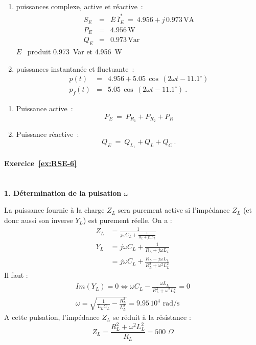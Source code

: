 \begin{enumerate}
	\item puissances complexe, active et réactive~:
	\begin{eqnarray*}
		S_E &=& \bar{E} \, \bar{I}_E^{\ast} \: = \ 4.956 + j\, 0.973 \, \text{VA}\\
		P_E &=& 4.956 \, \text{W}\\
		Q_E &=& 0.973 \, \text{Var}
	\end{eqnarray*}
	$E$ \, produit 0.973$\,$ Var et 4.956$\,$ W
	\item puissances instantanée et fluctuante~:
	\begin{eqnarray*}
		p(t) &=& 4.956 + 5.05\, \cos \, (2\omega t - 11.1^{\circ})\\
		p_f(t) &=& 5.05 \, \cos \, (2\omega t - 11.1^{\circ})~.
	\end{eqnarray*}
\end{enumerate}
\begin{enumerate}
	\item Puissance active~:
	\[ P_E \: = \: P_{R_1} + P_{R_2} + P_R \]
	\item Puissance réactive~:
	\[ Q_E \: = \: Q_{L_1} + Q_L + Q_C~. \]
\end{enumerate}

\paragraph{Exercice~\ref{ex:RSE-6}}~\\%
{\bf 1. Détermination de la pulsation $\omega$}

La puissance fournie à la charge $Z_L$ sera purement active si
l'impédance $Z_L$ (et donc aussi son inverse $Y_L$) est purement
réelle.
On a : 
\begin{align*}
	Z_L&=\frac{1}{j\omega C_L +\frac{1}{R_L+j\omega L_L}} \\
	Y_L & = j\omega C_L +\frac{1}{R_L+j\omega L_L}\\
	& = j\omega C_L  + \frac{R_L-j\omega L_L}{R_L^2+\omega^2 L_L^2}
\end{align*}
Il faut :
\begin{gather*}
	Im(Y_L)= 0 \Leftrightarrow 
	\omega C_L -\frac{\omega L_L}{R_L^2+\omega^2 L_L^2}=0\\
	\omega=\sqrt{\frac{1}{L_LC_L}-\frac{R_L^2}{L_L^2}} = 9.95\, 10^4 \text{~rad/s}
\end{gather*}
A cette pulsation, l'impédance $Z_L$ se réduit à la résistance :
\[Z_L=\frac{R_L^2+\omega^2L_L^2}{R_L}=500\,\, \Omega\]

